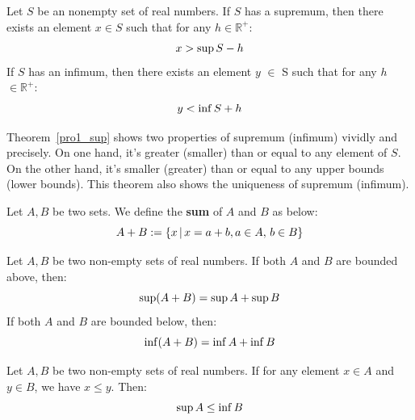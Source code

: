 	\begin{theoremenv}\label{pro1_sup}
		Let $S$ be an nonempty set of real numbers. If $S$ has a supremum, then there exists an element $x\in S$  such that for any  $h\in \mathbb{R}^+$:
		\begin{equation}
			x>\sup S-h\notag
		\end{equation} 
		If $S$ has an infimum, then there exists an element $y$ $\in$ S such that for any $h$ $\in \mathbb{R}^+$:
		\begin{equation}
			y<\inf S+h\notag
		\end{equation}
	\end{theoremenv}
	\begin{remarkenv}\label{two_pro_sup}
		Theorem~\ref{pro1_sup} shows two properties of supremum (infimum) vividly and precisely. On one hand, it's greater (smaller) than or equal to any element of $S$. On the other hand, it's smaller (greater) than or equal to any upper bounds (lower bounds). This theorem also shows the uniqueness of supremum (infimum).
	\end{remarkenv}
	\begin{definitionenv}
		Let $A,B$ be two sets. We define the \textbf{sum} of $A$ and $B$ as below:
		\begin{equation}
			A+B:=\{x\, |\, x=a+b,a\in A,\, b \in B\}\notag
		\end{equation}
	\end{definitionenv}
	\begin{theoremenv}
		Let $A,B$ be two non-empty sets of real numbers. If both $A$ and $B$ are bounded above, then:
		\begin{equation}
			\sup (A+B)=\sup A+\sup B\notag
		\end{equation}
		If both $A$ and $B$ are bounded below, then:
		\begin{equation}
			\inf(A+B)=\inf A+\inf B\notag
		\end{equation}
	\end{theoremenv}
	\begin{theoremenv}
		Let $A,B$ be two non-empty sets of real numbers. If for any element $x\in A$ and $y\in B$, we have $x\le y$. Then:
		\begin{equation}
			\sup A \le \inf B\notag
		\end{equation}
	\end{theoremenv}
